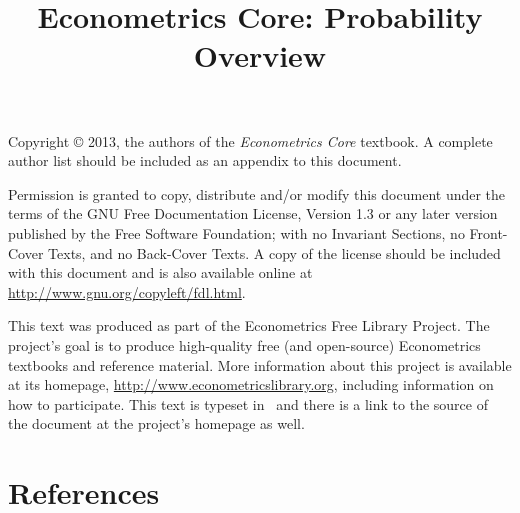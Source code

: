 \documentclass[nofonts]{tufte-latex/tufte-handout}
\title{Econometrics Core: Probability Overview}
\begin{document}
\maketitle

\bigskip\noindent%
Copyright © 2013, the authors of the \textit{Econometrics Core}
textbook.  A complete author list should be included as an appendix to
this document.

Permission is granted to copy, distribute and/or modify this document
under the terms of the GNU Free Documentation License, Version 1.3 or
any later version published by the Free Software Foundation; with no
Invariant Sections, no Front-Cover Texts, and no Back-Cover Texts.  A
copy of the license should be included with this document and is also
available online at \url{http://www.gnu.org/copyleft/fdl.html}.

This text was produced as part of the Econometrics Free Library
Project.  The project's goal is to produce high-quality free (and
open-source) Econometrics textbooks and reference material.  More
information about this project is available at its homepage,
\url{http://www.econometricslibrary.org}, including information on how
to participate.  This text is typeset in \XeLaTeX\ and there is a link
to the source of the document at the project's homepage as well.

%
\tableofcontents








% 

\part*{References}%

\end{document}
